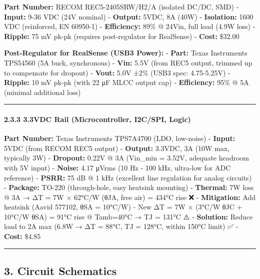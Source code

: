 \documentclass[
]{article}
\begin{document}
\textbf{Part Number:} RECOM REC5-2405SRW/H2/A (isolated DC/DC, SMD) -
\textbf{Input:} 9-36 VDC (24V nominal) - \textbf{Output:} 5VDC, 8A (40W)
- \textbf{Isolation:} 1600 VDC (reinforced, EN 60950-1) -
\textbf{Efficiency:} 89\% @ 24Vin, full load (4.9W loss) -
\textbf{Ripple:} 75 mV pk-pk (requires post-regulator for RealSense) -
\textbf{Cost:} \$32.00

\textbf{Post-Regulator for RealSense (USB3 Power):} - \textbf{Part:}
Texas Instruments TPS54560 (5A buck, synchronous) - \textbf{Vin:} 5.5V
(from REC5 output, trimmed up to compensate for dropout) -
\textbf{Vout:} 5.0V ±2\% (USB3 spec: 4.75-5.25V) - \textbf{Ripple:} 10
mV pk-pk (with 22 μF MLCC output cap) - \textbf{Efficiency:} 95\% @ 5A
(minimal additional loss)

\begin{center}\rule{0.5\linewidth}{0.5pt}\end{center}

\hypertarget{vdc-rail-microcontroller-i2cspi-logic}{%
\paragraph{2.3.3 3.3VDC Rail (Microcontroller, I2C/SPI,
Logic)}\label{vdc-rail-microcontroller-i2cspi-logic}}

\textbf{Part Number:} Texas Instruments TPS7A4700 (LDO, low-noise) -
\textbf{Input:} 5VDC (from RECOM REC5 output) - \textbf{Output:} 3.3VDC,
3A (10W max, typically 3W) - \textbf{Dropout:} 0.22V @ 3A (Vin\_min =
3.52V, adequate headroom with 5V input) - \textbf{Noise:} 4.17 μVrms (10
Hz - 100 kHz, ultra-low for ADC reference) - \textbf{PSRR:} 75 dB @ 1
kHz (excellent line regulation for analog circuits) - \textbf{Package:}
TO-220 (through-hole, easy heatsink mounting) - \textbf{Thermal:} 7W
loss @ 3A → ΔT = 7W × 62°C/W (θJA, free air) = 434°C rise ❌ -
\textbf{Mitigation:} Add heatsink (Aavid 577102, θSA = 10°C/W) - New ΔT
= 7W × (3°C/W θJC + 10°C/W θSA) = 91°C rise @ Tamb=40°C → TJ = 131°C ⚠️
- \textbf{Solution:} Reduce load to 2A max (6.8W → ΔT = 88°C, TJ =
128°C, within 150°C limit) ✅ - \textbf{Cost:} \$4.85

\begin{center}\rule{0.5\linewidth}{0.5pt}\end{center}

\hypertarget{circuit-schematics}{%
\subsection{3. Circuit Schematics}\label{circuit-schematics}}
\end{document}
